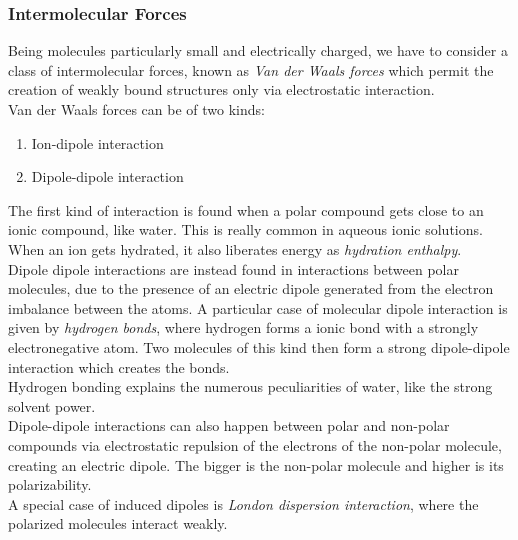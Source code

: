 \documentclass[../qm.tex]{subfiles}
\begin{document}
\subsubsection{Intermolecular Forces}
Being molecules particularly small and electrically charged, we have to consider a class of intermolecular forces, known as \textit{Van der Waals forces} which permit the creation of weakly bound structures only via electrostatic interaction.\\
Van der Waals forces can be of two kinds:
\begin{enumerate}
\item Ion-dipole interaction
\item Dipole-dipole interaction
\end{enumerate}
The first kind of interaction is found when a polar compound gets close to an ionic compound, like water. This is really common in aqueous ionic solutions. When an ion gets hydrated, it also liberates energy as \textit{hydration enthalpy}.\\
Dipole dipole interactions are instead found in interactions between polar molecules, due to the presence of an electric dipole generated from the electron imbalance between the atoms. A particular case of molecular dipole interaction is given by \textit{hydrogen bonds}, where hydrogen forms a ionic bond with a strongly electronegative atom. Two molecules of this kind then form a strong dipole-dipole interaction which creates the bonds.\\
Hydrogen bonding explains the numerous peculiarities of water, like the strong solvent power.\\
Dipole-dipole interactions can also happen between polar and non-polar compounds via electrostatic repulsion of the electrons of the non-polar molecule, creating an electric dipole. The bigger is the non-polar molecule and higher is its polarizability.\\
A special case of induced dipoles is \emph{London dispersion interaction}, where the polarized molecules interact weakly.
\end{document}
